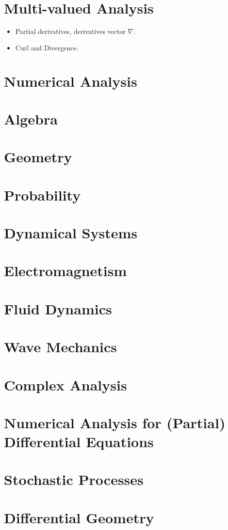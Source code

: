 \documentclass[10pt]{article}
\begin{document}
\section{Multi-valued Analysis}
\begin{itemize}
	\item Partial derivatives, derivatives vector $ \nabla $.
	\item Curl and Divergence. 
\end{itemize}
\section{Numerical Analysis}
\section{Algebra}
\section{Geometry}
\section{Probability}
\section{Dynamical Systems}
\section{Electromagnetism}
\section{Fluid Dynamics}
\section{Wave Mechanics}
\section{Complex Analysis}
\section{Numerical Analysis for (Partial) Differential Equations}
\section{Stochastic Processes}
\section{Differential Geometry}
\end{document}

